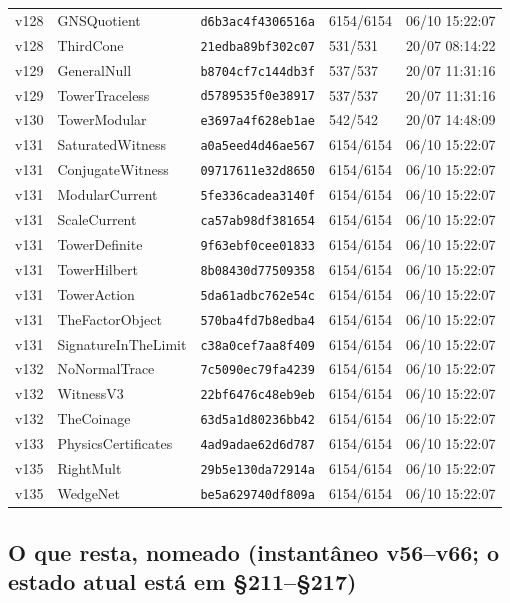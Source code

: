\documentclass[11pt]{article}
\theoremstyle{definition}\newtheorem{deriv}{Derivação}
\begin{document}
{\begin{longtable}{@{}lllll@{}}
v128 & GNSQuotient & \texttt{d6b3ac4f4306516a} & 6154/6154 & 06/10 15:22:07 \\
v128 & ThirdCone & \texttt{21edba89bf302c07} & 531/531 & 20/07 08:14:22 \\
v129 & GeneralNull & \texttt{b8704cf7c144db3f} & 537/537 & 20/07 11:31:16 \\
v129 & TowerTraceless & \texttt{d5789535f0e38917} & 537/537 & 20/07 11:31:16 \\
v130 & TowerModular & \texttt{e3697a4f628eb1ae} & 542/542 & 20/07 14:48:09 \\
v131 & SaturatedWitness & \texttt{a0a5eed4d46ae567} & 6154/6154 & 06/10 15:22:07 \\
v131 & ConjugateWitness & \texttt{09717611e32d8650} & 6154/6154 & 06/10 15:22:07 \\
v131 & ModularCurrent & \texttt{5fe336cadea3140f} & 6154/6154 & 06/10 15:22:07 \\
v131 & ScaleCurrent & \texttt{ca57ab98df381654} & 6154/6154 & 06/10 15:22:07 \\
v131 & TowerDefinite & \texttt{9f63ebf0cee01833} & 6154/6154 & 06/10 15:22:07 \\
v131 & TowerHilbert & \texttt{8b08430d77509358} & 6154/6154 & 06/10 15:22:07 \\
v131 & TowerAction & \texttt{5da61adbc762e54c} & 6154/6154 & 06/10 15:22:07 \\
v131 & TheFactorObject & \texttt{570ba4fd7b8edba4} & 6154/6154 & 06/10 15:22:07 \\
v131 & SignatureInTheLimit & \texttt{c38a0cef7aa8f409} & 6154/6154 & 06/10 15:22:07 \\
v132 & NoNormalTrace & \texttt{7c5090ec79fa4239} & 6154/6154 & 06/10 15:22:07 \\
v132 & WitnessV3 & \texttt{22bf6476c48eb9eb} & 6154/6154 & 06/10 15:22:07 \\
v132 & TheCoinage & \texttt{63d5a1d80236bb42} & 6154/6154 & 06/10 15:22:07 \\
v133 & PhysicsCertificates & \texttt{4ad9adae62d6d787} & 6154/6154 & 06/10 15:22:07 \\
v135 & RightMult & \texttt{29b5e130da72914a} & 6154/6154 & 06/10 15:22:07 \\
v135 & WedgeNet & \texttt{be5a629740df809a} & 6154/6154 & 06/10 15:22:07 \\
\bottomrule\end{longtable}}

\subsection*{O que resta, nomeado (instantâneo v56--v66; o estado atual está em \S211--\S217)}
\end{document}
